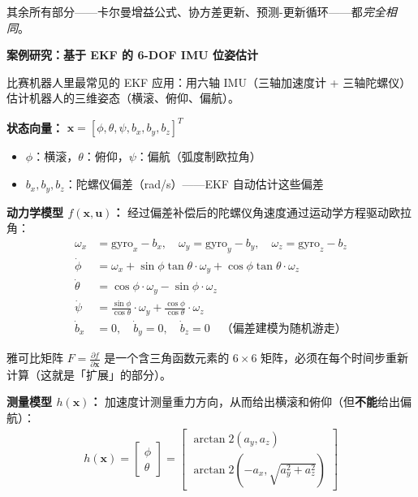 其余所有部分——卡尔曼增益公式、协方差更新、预测-更新循环——都\textit{完全相同}。

\vspace{0.5em}
\begin{mdframed}[linewidth=1pt, innertopmargin=10pt, innerbottommargin=10pt]
\textbf{案例研究：基于 EKF 的 6-DOF IMU 位姿估计}

\vspace{0.3em}
比赛机器人里最常见的 EKF 应用：用六轴 IMU（三轴加速度计 + 三轴陀螺仪）估计机器人的三维姿态（横滚、俯仰、偏航）。

\textbf{状态向量：} $\mathbf{x} = [\phi, \theta, \psi, b_x, b_y, b_z]^T$
\begin{itemize}[nosep]
    \item $\phi$：横滚，$\theta$：俯仰，$\psi$：偏航（弧度制欧拉角）
    \item $b_x, b_y, b_z$：陀螺仪偏差（rad/s）——EKF 自动估计这些偏差
\end{itemize}

\textbf{动力学模型 $f(\mathbf{x}, \mathbf{u})$：} 经过偏差补偿后的陀螺仪角速度通过运动学方程驱动欧拉角：
\begin{align}
\omega_x &= \text{gyro}_x - b_x, \quad \omega_y = \text{gyro}_y - b_y, \quad \omega_z = \text{gyro}_z - b_z \\[3pt]
\dot{\phi} &= \omega_x + \sin\phi \tan\theta \cdot \omega_y + \cos\phi \tan\theta \cdot \omega_z \\
\dot{\theta} &= \cos\phi \cdot \omega_y - \sin\phi \cdot \omega_z \\
\dot{\psi} &= \frac{\sin\phi}{\cos\theta} \cdot \omega_y + \frac{\cos\phi}{\cos\theta} \cdot \omega_z \\[3pt]
\dot{b}_x &= 0, \quad \dot{b}_y = 0, \quad \dot{b}_z = 0 \quad \text{（偏差建模为随机游走）}
\end{align}

雅可比矩阵 $F = \frac{\partial f}{\partial \mathbf{x}}$ 是一个含三角函数元素的 $6 \times 6$ 矩阵，必须在每个时间步重新计算（这就是「扩展」的部分）。

\textbf{测量模型 $h(\mathbf{x})$：} 加速度计测量重力方向，从而给出横滚和俯仰（但\textbf{不能}给出偏航）：
\begin{align}
h(\mathbf{x}) = \begin{bmatrix} \phi \\ \theta \end{bmatrix} = \begin{bmatrix} \arctan2(a_y, a_z) \\ \arctan2(-a_x, \sqrt{a_y^2 + a_z^2}) \end{bmatrix}
\end{align}


\end{mdframed}
